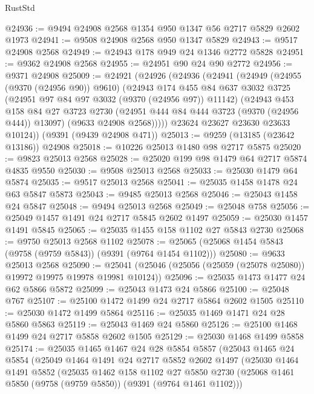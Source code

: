 \begin{lexlean}{RustStd}
\begin{coremodule}
@24936 := @9494 @24908 @2568 @1354 @950 @1347 @56 @2717 @5829 @2602 @1973
@24941 := @9508 @24908 @2568 @950 @1347 @5829
@24943 := @9517 @24908 @2568
@24949 := @24943 @178 @949 @24 @1346 @2772 @5828
@24951 := @9362 @24908 @2568
@24955 := @24951 @90 @24 @90 @2772
@24956 := @9371 @24908
@25009 := @24921
    (@24926
      (@24936
        (@24941
          (@24949
            (@24955 (@9370 (@24956 @90)) @9610)
            (@24943
              @174
              @455
              @84
              @637
              @3032
              @3725
              (@24951 @97 @84 @97 @3032 (@9370 (@24956 @97)) @11142)
              (@24943
                @453
                @158
                @84
                @27
                @3723
                @2730
                (@24951 @444 @84 @444 @3723 (@9370 (@24956 @444)) @13097)
                (@9633 @24908 @2568)))))
        @23624
        @23627
        @23630
        @23633
        @10124))
    (@9391 (@9439 @24908 @471))
@25013 := @9259 (@13185 (@23642 @13186)) @24908
@25018 := @10226 @25013 @1480 @98 @2717 @5875
@25020 := @9823 @25013 @2568
@25028 := @25020 @199 @98 @1479 @64 @2717 @5874 @4835 @9550
@25030 := @9508 @25013 @2568
@25033 := @25030 @1479 @64 @5874
@25035 := @9517 @25013 @2568
@25041 := @25035 @1458 @1478 @24 @63 @5847 @5873
@25043 := @9485 @25013 @2568
@25046 := @25043 @1458 @24 @5847
@25048 := @9494 @25013 @2568
@25049 := @25048 @758
@25056 := @25049 @1457 @1491 @24 @2717 @5845 @2602 @1497
@25059 := @25030 @1457 @1491 @5845
@25065 := @25035 @1455 @158 @1102 @27 @5843 @2730
@25068 := @9750 @25013 @2568 @1102
@25078 := @25065 (@25068 @1454 @5843 (@9758 (@9759 @5843)) (@9391 (@9764 @1454 @1102)))
@25080 := @9633 @25013 @2568
@25090 := @25041 (@25046 (@25056 (@25059 (@25078 @25080)) @19972 @19975 @19978 @19981 @10124))
@25096 := @25035 @1473 @1477 @24 @62 @5866 @5872
@25099 := @25043 @1473 @24 @5866
@25100 := @25048 @767
@25107 := @25100 @1472 @1499 @24 @2717 @5864 @2602 @1505
@25110 := @25030 @1472 @1499 @5864
@25116 := @25035 @1469 @1471 @24 @28 @5860 @5863
@25119 := @25043 @1469 @24 @5860
@25126 := @25100 @1468 @1499 @24 @2717 @5858 @2602 @1505
@25129 := @25030 @1468 @1499 @5858
@25174 := @25035
    @1465
    @1467
    @24
    @28
    @5854
    @5857
    (@25043
      @1465
      @24
      @5854
      (@25049
        @1464
        @1491
        @24
        @2717
        @5852
        @2602
        @1497
        (@25030
          @1464
          @1491
          @5852
          (@25035
            @1462
            @158
            @1102
            @27
            @5850
            @2730
            (@25068 @1461 @5850 (@9758 (@9759 @5850)) (@9391 (@9764 @1461 @1102)))

\end{coremodule}
\end{lexlean}
